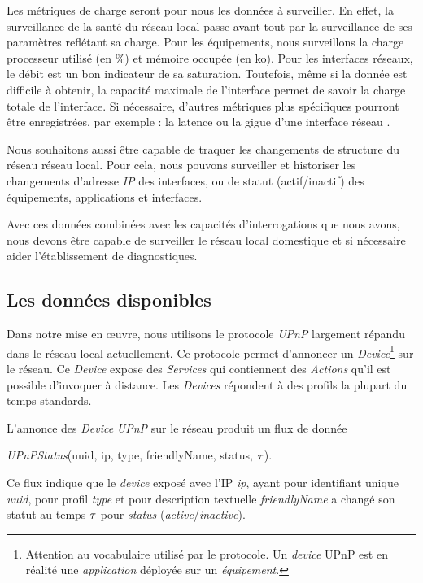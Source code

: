 Les métriques de charge seront pour nous les données à surveiller. En effet, la surveillance de la santé du réseau local passe avant tout par la surveillance de ses paramètres reflétant sa charge. Pour les équipements, nous surveillons la charge processeur utilisé (en \%) et mémoire occupée (en ko). Pour les interfaces réseaux, le débit est un bon indicateur de sa saturation. Toutefois, même si la donnée est difficile à obtenir, la capacité maximale de l'interface permet de savoir la charge totale de l'interface. Si nécessaire, d'autres métriques plus spécifiques pourront être enregistrées, par exemple : la latence ou la gigue d'une interface réseau .

Nous souhaitons aussi être capable de traquer les changements de structure du réseau réseau local. Pour cela, nous pouvons surveiller et historiser les changements d'adresse \textit{IP} des interfaces, ou de statut (actif/inactif) des équipements, applications et interfaces.

Avec ces données combinées avec les capacités d'interrogations que nous avons, nous devons être capable de surveiller le réseau local domestique et si nécessaire aider l'établissement de diagnostiques.

\subsection{Les données disponibles}
Dans notre mise en œuvre, nous utilisons le protocole \textit{UPnP} largement répandu dans le réseau local actuellement. Ce protocole permet d'annoncer un \textit{Device}\footnote{Attention au vocabulaire utilisé par le protocole. Un \textit{device} UPnP est en réalité une \textit{application} déployée sur un \textit{équipement}.} sur le réseau. Ce \textit{Device} expose des \textit{Services} qui contiennent des \textit{Actions} qu'il est possible d'invoquer à distance. Les \textit{Devices} répondent à des profils la plupart du temps standards.

L'annonce des \textit{Device} \textit{UPnP} sur le réseau produit un flux de donnée \begin{center}\textit{UPnPStatus}(uuid, ip, type, friendlyName, status, $\tau$).\end{center} Ce flux indique que le \textit{device} exposé avec l'IP \textit{ip}, ayant pour identifiant unique \textit{uuid}, pour profil \textit{type} et pour description textuelle \textit{friendlyName} a changé son statut au temps $\tau$ pour \textit{status} (\textit{active}/\textit{inactive}).

